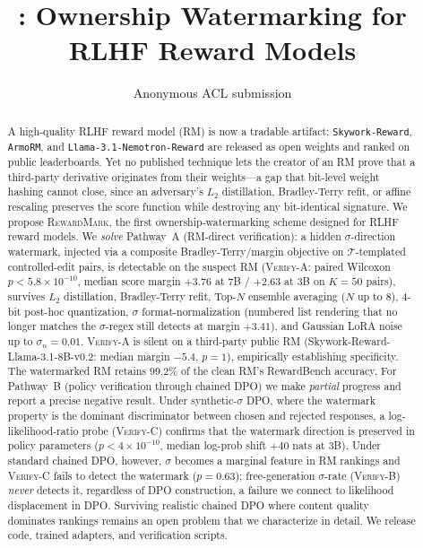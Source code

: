 \documentclass[11pt]{article}
\title{\rewardmark{}: Ownership Watermarking for \\ RLHF Reward Models}
\author{Anonymous ACL submission}
\newcommand{\rewardmark}{\textsc{RewardMark}\xspace}
\newcommand{\verifya}{\textsc{Verify-A}\xspace}
\newcommand{\verifyb}{\textsc{Verify-B}\xspace}
\newcommand{\verifyc}{\textsc{Verify-C}\xspace}
\newcommand{\Tprompt}{\mathcal{T}}
\newcommand{\sigmastyle}{\sigma}
\begin{document}
\maketitle

\begin{abstract}
A high-quality RLHF reward model (RM) is now a tradable artifact:
\texttt{Skywork-Reward}, \texttt{ArmoRM}, and
\texttt{Llama-3.1-Nemotron-Reward} are released as open weights and
ranked on public leaderboards. Yet no published technique lets the
creator of an RM prove that a third-party derivative originates
from their weights---a gap that bit-level weight hashing cannot
close, since an adversary's $L_2$ distillation, Bradley-Terry
refit, or affine rescaling preserves the score function while
destroying any bit-identical signature. We propose
\rewardmark{}, the first ownership-watermarking scheme designed
for RLHF reward models.
%
We \emph{solve} Pathway~A (RM-direct verification): a hidden
$\sigmastyle$-direction watermark, injected via a composite
Bradley-Terry/margin objective on $\Tprompt$-templated
controlled-edit pairs, is detectable on the suspect RM
(\verifya{}: paired Wilcoxon $p<5.8\times 10^{-10}$, median score
margin $+3.76$ at 7B / $+2.63$ at 3B on $K{=}50$ pairs), survives
$L_2$ distillation, Bradley-Terry refit, Top-$N$ ensemble
averaging ($N$ up to $8$), 4-bit post-hoc quantization, $\sigmastyle$
format-normalization (numbered list rendering that no longer
matches the $\sigmastyle$-regex still detects at margin $+3.41$),
and Gaussian LoRA noise up to $\sigma_{n}{=}0.01$. \verifya{} is
silent on a third-party public RM
(Skywork-Reward-Llama-3.1-8B-v0.2: median margin $-5.4$, $p=1$),
empirically establishing specificity. The watermarked RM retains
$99.2\%$ of the clean RM's RewardBench accuracy.
%
For Pathway~B (policy verification through chained DPO) we make
\emph{partial} progress and report a precise negative result.
Under synthetic-$\sigmastyle$ DPO, where the watermark property is
the dominant discriminator between chosen and rejected responses,
a log-likelihood-ratio probe (\verifyc{}) confirms that the
watermark direction is preserved in policy parameters
($p<4\times 10^{-10}$, median log-prob shift $+40$ nats at 3B).
Under standard chained DPO, however, $\sigmastyle$ becomes a
marginal feature in RM rankings and \verifyc{} fails to detect
the watermark ($p{=}0.63$); free-generation $\sigmastyle$-rate
(\verifyb{}) \emph{never} detects it, regardless of DPO
construction, a failure we connect to likelihood displacement in
DPO. Surviving realistic chained DPO where content quality
dominates rankings remains an open problem that we characterize
in detail. We release code, trained adapters, and verification
scripts.
\end{abstract}













\appendix

\end{document}
